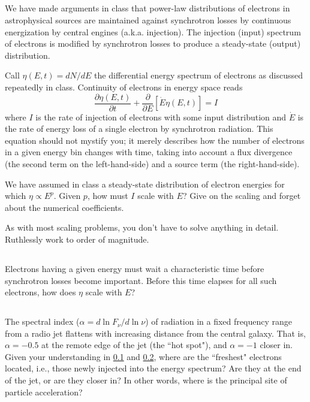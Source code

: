 \documentclass[11pt]{article}
\begin{document}
\subsection{}\label{partc}
We have made arguments in class that power-law distributions of electrons in
astrophysical sources are maintained against synchrotron losses by continuous
energization by central engines (a.k.a. injection). The injection (input)
spectrum of electrons is modified by synchrotron losses to produce a
steady-state (output) distribution.

Call $\eta(E,t)=dN/dE$ the differential energy spectrum of electrons as
discussed repeatedly in class. Continuity of electrons in energy space reads
\begin{equation}
\frac{\partial\eta(E,t)}{\partial t}+\frac{\partial}{\partial E}[\dot E\eta(E,t)]=I
\end{equation}
where $I$ is the rate of injection of electrons with some input distribution
and $\dot E$ is the rate of energy loss of a single electron by synchrotron
radiation. This equation should not mystify you; it merely describes how the
number of electrons in a given energy
bin changes with time, taking into account a flux divergence (the second term
on the left-hand-side) and a source term (the right-hand-side).

We have assumed in class a steady-state distribution of electron energies for which
$\eta\propto E^p$.  Given $p$, how must $I$ scale with $E$?  Give on the scaling and
forget about the numerical coefficients.

As with most scaling problems, you don’t have to solve anything in detail. Ruthlessly work to order of magnitude.

\subsection{}\label{partd}
Electrons having a given energy must wait a characteristic time 
before synchrotron losses become important. Before this time elapses 
for all such electrons, how does $\eta$ scale with $E$?

\subsection{}
The spectral index ($\alpha = d\ln F_\nu/d\ln\nu$) of radiation in a fixed frequency
range from a radio jet flattens with increasing distance from the central
galaxy. That is, $\alpha = −0.5$ at the remote edge of the jet (the ``hot spot"), and $\alpha=-1$
closer in. Given your understanding in \ref{partc} and \ref{partd}, where are the
``freshest" electrons located, i.e., those newly injected into the energy
spectrum? Are they at the end of the jet, or are they closer in? In other
words, where is the principal site of particle acceleration?
\end{document}
